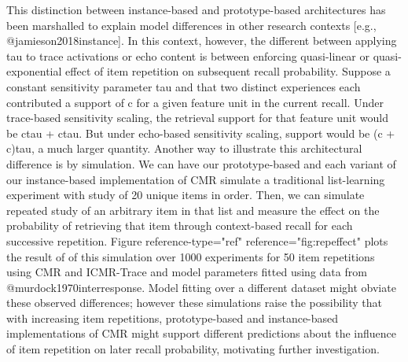 {}This distinction between instance-based and prototype-based architectures has been marshalled to explain model differences in other research contexts [e.g., @jamieson2018instance]. In this context, however, the different between applying \markdownRendererDollarSign{}\markdownRendererBackslash{}tau\markdownRendererDollarSign{} to trace activations or echo content is between enforcing quasi-linear or quasi-exponential effect of item repetition on subsequent recall probability. Suppose a constant sensitivity parameter \markdownRendererDollarSign{}\markdownRendererBackslash{}tau\markdownRendererDollarSign{} and that two distinct experiences each contributed a support of \markdownRendererDollarSign{}c\markdownRendererDollarSign{} for a given feature unit in the current recall. Under trace-based sensitivity scaling, the retrieval support for that feature unit would be \markdownRendererDollarSign{}c\markdownRendererCircumflex{}\markdownRendererLeftBrace{}\markdownRendererBackslash{}tau\markdownRendererRightBrace{} + c\markdownRendererCircumflex{}\markdownRendererLeftBrace{}\markdownRendererBackslash{}tau\markdownRendererRightBrace{}\markdownRendererDollarSign{}. But under echo-based sensitivity scaling, support would be \markdownRendererDollarSign{}\markdownRendererLeftBrace{}(c + c)\markdownRendererRightBrace{}\markdownRendererCircumflex{}\markdownRendererLeftBrace{}\markdownRendererBackslash{}tau\markdownRendererRightBrace{}\markdownRendererDollarSign{}, a much larger quantity.\markdownRendererInterblockSeparator
{}Another way to illustrate this architectural difference is by simulation. We can have our prototype-based and each variant of our instance-based implementation of CMR simulate a traditional list-learning experiment with study of 20 unique items in order. Then, we can simulate repeated study of an arbitrary item in that list and measure the effect on the probability of retrieving that item through context-based recall for each successive repetition. Figure \markdownRendererLeftBrace{}reference-type="ref" reference="fig:repeffect"\markdownRendererRightBrace{} plots the result of of this simulation over 1000 experiments for 50 item repetitions using CMR and ICMR-Trace and model parameters fitted using data from @murdock1970interresponse. Model fitting over a different dataset might obviate these observed differences; however these simulations raise the possibility that with increasing item repetitions, prototype-based and instance-based implementations of CMR might support different predictions about the influence of item repetition on later recall probability, motivating further investigation.\markdownRendererInterblockSeparator
